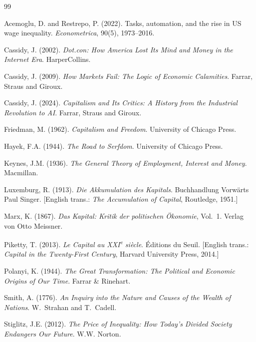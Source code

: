 \documentclass[11pt, a4paper]{article}
\theoremstyle{plain}
\theoremstyle{definition}
\begin{document}
\newpage
\begin{thebibliography}{99}

Acemoglu, D. and Restrepo, P. (2022).
Tasks, automation, and the rise in US wage inequality.
\textit{Econometrica}, 90(5), 1973--2016.

Cassidy, J. (2002).
\textit{Dot.con: How America Lost Its Mind and Money in the Internet Era}.
HarperCollins.

Cassidy, J. (2009).
\textit{How Markets Fail: The Logic of Economic Calamities}.
Farrar, Straus and Giroux.

Cassidy, J. (2024).
\textit{Capitalism and Its Critics: A History from the Industrial Revolution
to AI}. Farrar, Straus and Giroux.

Friedman, M. (1962).
\textit{Capitalism and Freedom}.
University of Chicago Press.

Hayek, F.A. (1944).
\textit{The Road to Serfdom}.
University of Chicago Press.

Keynes, J.M. (1936).
\textit{The General Theory of Employment, Interest and Money}.
Macmillan.

Luxemburg, R. (1913).
\textit{Die Akkumulation des Kapitals}.
Buchhandlung Vorwärts Paul Singer.
[English trans.: \textit{The Accumulation of Capital},
Routledge, 1951.]

Marx, K. (1867).
\textit{Das Kapital: Kritik der politischen Ökonomie}, Vol.~1.
Verlag von Otto Meissner.

Piketty, T. (2013).
\textit{Le Capital au XXI\textsuperscript{e} si\`{e}cle}.
\'{E}ditions du Seuil.
[English trans.: \textit{Capital in the Twenty-First Century},
Harvard University Press, 2014.]

Polanyi, K. (1944).
\textit{The Great Transformation: The Political and Economic Origins of
Our Time}. Farrar \& Rinehart.

Smith, A. (1776).
\textit{An Inquiry into the Nature and Causes of the Wealth of Nations}.
W.~Strahan and T.~Cadell.

Stiglitz, J.E. (2012).
\textit{The Price of Inequality: How Today's Divided Society Endangers
Our Future}. W.W. Norton.

\end{thebibliography}
\end{document}
